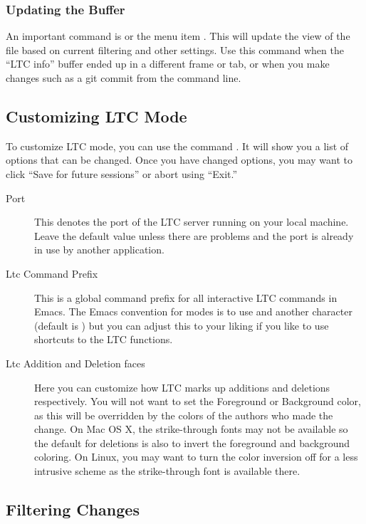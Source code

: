 \subsubsection{Updating the Buffer}

An important command is  or the menu item .  This will update the  view of the file based on current filtering and other settings.  Use this command when the ``LTC info'' buffer ended up in a different frame or tab, or when you make changes such as a git commit from the command line.

\subsection{Customizing LTC Mode}

To customize LTC mode, you can use the command .  It will show you a list of options that can be changed.  Once you have changed options, you may want to click ``Save for future sessions'' or abort using ``Exit.''

\begin{description}
\item[Port] This denotes the port of the LTC server running on your local machine.  Leave the default value unless there are problems and the port is already in use by another application.
\item[Ltc Command Prefix] This is a global command prefix for all interactive LTC commands in Emacs.  The Emacs convention for modes is to use  and another character (default is ) but you can adjust this to your liking if you like to use shortcuts to the LTC functions.
\item[Ltc Addition and Deletion faces]  Here you can customize how LTC marks up additions and deletions respectively.  You will not want to set the Foreground or Background color, as this will be overridden by the colors of the authors who made the change.  On Mac OS X, the strike-through fonts may not be available so the default for deletions is also to invert the foreground and background coloring.  On Linux, you may want to turn the color inversion off for a less intrusive scheme as the strike-through font is available there.
\end{description}

\subsection{Filtering Changes}

